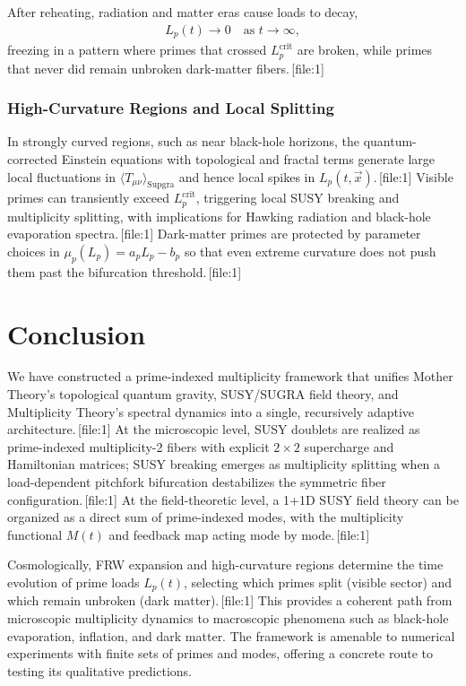 \documentclass[11pt]{article}
\begin{document}
After reheating, radiation and matter eras cause loads to decay,
\begin{align}
L_p(t)\to 0 \quad \text{as } t\to\infty,
\end{align}
freezing in a pattern where primes that crossed \(L_p^{\mathrm{crit}}\) are broken, while primes that never did remain unbroken dark-matter fibers.\,[file:1]

\subsubsection{High-Curvature Regions and Local Splitting}

In strongly curved regions, such as near black-hole horizons, the quantum-corrected Einstein equations with topological and fractal terms generate large local fluctuations in \(\langle T_{\mu\nu}\rangle_{\mathrm{Supgra}}\) and hence local spikes in \(L_p(t,\vec{x})\).\,[file:1] Visible primes can transiently exceed \(L_p^{\mathrm{crit}}\), triggering local SUSY breaking and multiplicity splitting, with implications for Hawking radiation and black-hole evaporation spectra.\,[file:1] Dark-matter primes are protected by parameter choices in \(\mu_p(L_p)=a_p L_p-b_p\) so that even extreme curvature does not push them past the bifurcation threshold.\,[file:1]

\section{Conclusion}

We have constructed a prime-indexed multiplicity framework that unifies Mother Theory's topological quantum gravity, SUSY/SUGRA field theory, and Multiplicity Theory's spectral dynamics into a single, recursively adaptive architecture.\,[file:1] At the microscopic level, SUSY doublets are realized as prime-indexed multiplicity-2 fibers with explicit \(2\times 2\) supercharge and Hamiltonian matrices; SUSY breaking emerges as multiplicity splitting when a load-dependent pitchfork bifurcation destabilizes the symmetric fiber configuration.\,[file:1] At the field-theoretic level, a 1+1D SUSY field theory can be organized as a direct sum of prime-indexed modes, with the multiplicity functional \(M(t)\) and feedback map acting mode by mode.\,[file:1]

Cosmologically, FRW expansion and high-curvature regions determine the time evolution of prime loads \(L_p(t)\), selecting which primes split (visible sector) and which remain unbroken (dark matter).\,[file:1] This provides a coherent path from microscopic multiplicity dynamics to macroscopic phenomena such as black-hole evaporation, inflation, and dark matter. The framework is amenable to numerical experiments with finite sets of primes and modes, offering a concrete route to testing its qualitative predictions.
\end{document}
